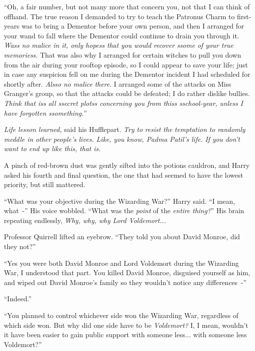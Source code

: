 ``Oh, a fair number, but not many more that concern you, not that I can think of offhand. The true reason I demanded to try to teach the Patronus Charm to first-years was to bring a Dementor before your own person, and then I arranged for your wand to fall where the Dementor could continue to drain you through it. \emph{Wass no malice in it, only hopess that you would recover ssome of your true memoriess.} That was also why I arranged for certain witches to pull you down from the air during your rooftop episode, so I could appear to save your life; just in case any suspicion fell on me during the Dementor incident I had scheduled for shortly after. \emph{Alsso no malice there.} I arranged some of the attacks on Miss Granger's group, so that the attacks could be defeated; I do rather dislike bullies. \emph{Think that iss all ssecret plotss concerning you from thiss sschool-year, unless I have forgotten ssomething.}''

\emph{Life lesson learned,} said his Hufflepart. \emph{Try to resist the temptation to randomly meddle in other people's lives. Like, you know, Padma Patil's life. If you don't want to end up like this, that is.}

A pinch of red-brown dust was gently sifted into the potions cauldron, and Harry asked his fourth and final question, the one that had seemed to have the lowest priority, but still mattered.

``What was your objective during the Wizarding War?'' Harry said. ``I mean, what~-'' His voice wobbled. ``What was the \emph{point} of the \emph{entire thing?}'' His brain repeating endlessly, \emph{Why, why, why Lord Voldemort...}

Professor Quirrell lifted an eyebrow. ``They told you about David Monroe, did they not?''

``Yes you were both David Monroe and Lord Voldemort during the Wizarding War, I understood that part. You killed David Monroe, disguised yourself as him, and wiped out David Monroe's family so they wouldn't notice any differences~-''

``Indeed.''

``You planned to control whichever side won the Wizarding War, regardless of which side won. But why did one side have to be \emph{Voldemort?} I, I mean, wouldn't it have been easier to gain public support with someone less... with someone less Voldemort?''

